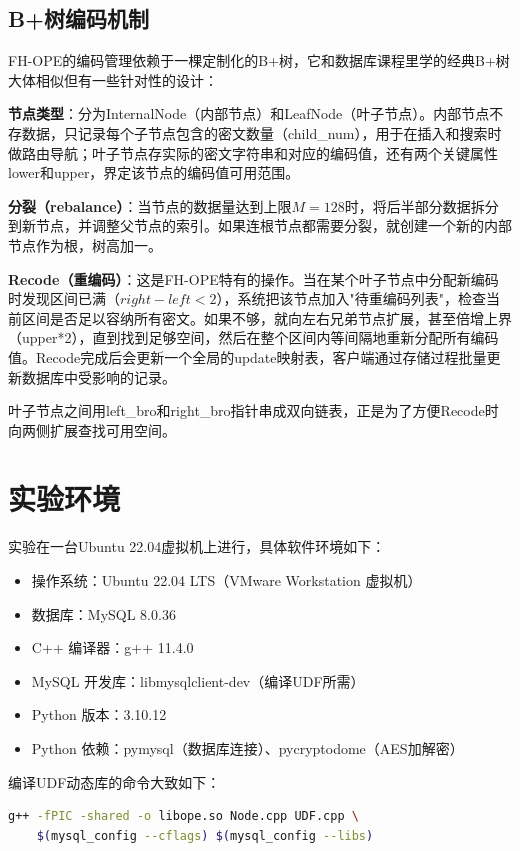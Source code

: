 \documentclass[a4paper]{article}
\begin{document}
\subsection{B+树编码机制}

FH-OPE的编码管理依赖于一棵定制化的B+树，它和数据库课程里学的经典B+树大体相似但有一些针对性的设计：

\textbf{节点类型}：分为InternalNode（内部节点）和LeafNode（叶子节点）。内部节点不存数据，只记录每个子节点包含的密文数量（child\_num），用于在插入和搜索时做路由导航；叶子节点存实际的密文字符串和对应的编码值，还有两个关键属性lower和upper，界定该节点的编码值可用范围。

\textbf{分裂（rebalance）}：当节点的数据量达到上限$M=128$时，将后半部分数据拆分到新节点，并调整父节点的索引。如果连根节点都需要分裂，就创建一个新的内部节点作为根，树高加一。

\textbf{Recode（重编码）}：这是FH-OPE特有的操作。当在某个叶子节点中分配新编码时发现区间已满（$right-left<2$），系统把该节点加入"待重编码列表"，检查当前区间是否足以容纳所有密文。如果不够，就向左右兄弟节点扩展，甚至倍增上界（upper*2），直到找到足够空间，然后在整个区间内等间隔地重新分配所有编码值。Recode完成后会更新一个全局的update映射表，客户端通过存储过程批量更新数据库中受影响的记录。

叶子节点之间用left\_bro和right\_bro指针串成双向链表，正是为了方便Recode时向两侧扩展查找可用空间。

\section{实验环境}

实验在一台Ubuntu 22.04虚拟机上进行，具体软件环境如下：

\begin{itemize}
    \item 操作系统：Ubuntu 22.04 LTS（VMware Workstation 虚拟机）
    \item 数据库：MySQL 8.0.36
    \item C++ 编译器：g++ 11.4.0
    \item MySQL 开发库：libmysqlclient-dev（编译UDF所需）
    \item Python 版本：3.10.12
    \item Python 依赖：pymysql（数据库连接）、pycryptodome（AES加解密）
\end{itemize}

编译UDF动态库的命令大致如下：

\begin{lstlisting}[language=bash]
g++ -fPIC -shared -o libope.so Node.cpp UDF.cpp \
    $(mysql_config --cflags) $(mysql_config --libs)
\end{lstlisting}
\end{document}

